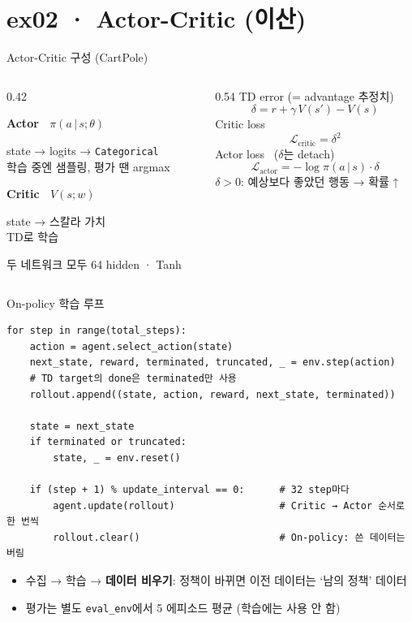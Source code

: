 \documentclass[aspectratio=169,11pt,xcolor=table]{beamer}
\newcommand{\boxtitle}[1]{{\bfseries\color{brand}#1}\par\smallskip}
\newcommand{\cc}[1]{\texttt{#1}}
\begin{document}
\section{ex02 · Actor-Critic (이산)}

\begin{frame}{Actor-Critic 구성 (CartPole)}
  \begin{columns}[T,onlytextwidth]
    \begin{column}{0.42\textwidth}
      \begin{keybox}
        \boxtitle{Actor \ $\pi(a\,|\,s;\theta)$}
        state → logits → \cc{Categorical}\\
        학습 중엔 샘플링, 평가 땐 argmax
      \end{keybox}
      \begin{keybox}
        \boxtitle{Critic \ $V(s; w)$}
        state → 스칼라 가치\\
        TD로 학습
      \end{keybox}
      {\footnotesize\color{muted} 두 네트워크 모두 64 hidden · Tanh}
    \end{column}
    \begin{column}{0.54\textwidth}
      \vspace{0.2em}
      TD error (= advantage 추정치)
      \[ \delta = r + \gamma\, V(s') - V(s) \]
      Critic loss
      \[ \mathcal{L}_{\text{critic}} = \delta^2 \]
      Actor loss \ {\footnotesize\color{muted}($\delta$는 detach)}
      \[ \mathcal{L}_{\text{actor}} = -\log \pi(a\,|\,s) \cdot \delta \]
      {\small $\delta > 0$: 예상보다 좋았던 행동 → 확률 ↑}
    \end{column}
  \end{columns}
\end{frame}

\begin{frame}[fragile]{On-policy 학습 루프}
\begin{lstlisting}
for step in range(total_steps):
    action = agent.select_action(state)
    next_state, reward, terminated, truncated, _ = env.step(action)
    # TD target의 done은 terminated만 사용
    rollout.append((state, action, reward, next_state, terminated))

    state = next_state
    if terminated or truncated:
        state, _ = env.reset()

    if (step + 1) % update_interval == 0:      # 32 step마다
        agent.update(rollout)                  # Critic → Actor 순서로 한 번씩
        rollout.clear()                        # On-policy: 쓴 데이터는 버림
\end{lstlisting}
  \vspace{0.2em}
  \begin{itemize}\small
    \item 수집 → 학습 → \textbf{데이터 비우기}: 정책이 바뀌면 이전 데이터는 ‘남의 정책’ 데이터
    \item 평가는 별도 \cc{eval\_env}에서 5 에피소드 평균 (학습에는 사용 안 함)
  \end{itemize}
\end{frame}
\end{document}
